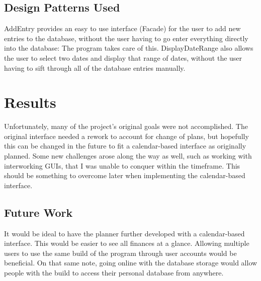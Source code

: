 \documentclass[10pt,conference,onecolumn,compsoc]{IEEEtran}
\begin{document}

\subsection{Design Patterns Used}
AddEntry provides an easy to use interface (Facade) for the user to add new entries to the database, without the user having to go enter everything directly into the database: The program takes care of this.
DisplayDateRange also allows the user to select two dates and display that range of dates, without the user having to sift through all of the database entries manually.

\section{Results}
Unfortunately, many of the project's original goals were not accomplished. The original interface needed a rework to account for change of plans, but hopefully this can be changed in the future to fit a calendar-based interface as originally planned. Some new challenges arose along the way as well, such as working with interworking GUIs, that I was unable to conquer within the timeframe. This should be something to overcome later when implementing the calendar-based interface.

\subsection{Future Work}
It would be ideal to have the planner further developed with a calendar-based interface. This would be easier to see all finances at a glance.
Allowing multiple users to use the same build of the program through user accounts would be beneficial.
On that same note, going online with the database storage would allow people with the build to access their personal database from anywhere.

\end{document}
